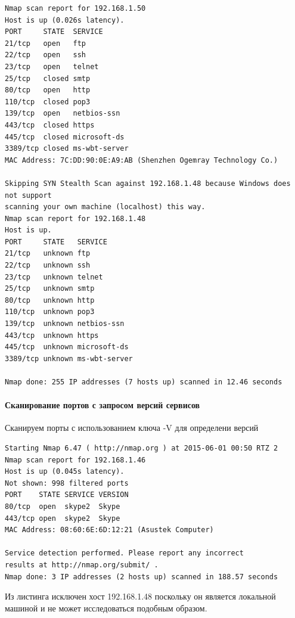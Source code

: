 \documentclass[a4paper, 14pt]{article}				%
\begin{document}
\begin{Verbatim}[frame=single]
Nmap scan report for 192.168.1.50
Host is up (0.026s latency).
PORT     STATE  SERVICE
21/tcp   open   ftp
22/tcp   open   ssh
23/tcp   open   telnet
25/tcp   closed smtp
80/tcp   open   http
110/tcp  closed pop3
139/tcp  open   netbios-ssn
443/tcp  closed https
445/tcp  closed microsoft-ds
3389/tcp closed ms-wbt-server
MAC Address: 7C:DD:90:0E:A9:AB (Shenzhen Ogemray Technology Co.)

Skipping SYN Stealth Scan against 192.168.1.48 because Windows does not support
scanning your own machine (localhost) this way.
Nmap scan report for 192.168.1.48
Host is up.
PORT     STATE   SERVICE
21/tcp   unknown ftp
22/tcp   unknown ssh
23/tcp   unknown telnet
25/tcp   unknown smtp
80/tcp   unknown http
110/tcp  unknown pop3
139/tcp  unknown netbios-ssn
443/tcp  unknown https
445/tcp  unknown microsoft-ds
3389/tcp unknown ms-wbt-server

Nmap done: 255 IP addresses (7 hosts up) scanned in 12.46 seconds
\end{Verbatim}

\paragraph{Сканирование портов с запросом версий сервисов\\}
Сканируем порты с использованием ключа -V для определени версий
\begin{Verbatim}[frame=single]
Starting Nmap 6.47 ( http://nmap.org ) at 2015-06-01 00:50 RTZ 2
Nmap scan report for 192.168.1.46
Host is up (0.045s latency).
Not shown: 998 filtered ports
PORT    STATE SERVICE VERSION
80/tcp  open  skype2  Skype
443/tcp open  skype2  Skype
MAC Address: 08:60:6E:6D:12:21 (Asustek Computer)

Service detection performed. Please report any incorrect 
results at http://nmap.org/submit/ .
Nmap done: 3 IP addresses (2 hosts up) scanned in 188.57 seconds
\end{Verbatim}
Из листинга исключен хост 192.168.1.48 поскольку он является локальной машиной и не может исследоваться подобным образом.
\end{document}
